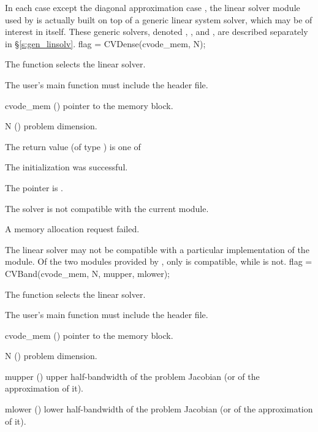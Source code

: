 In each case except the diagonal approximation case {\cvdiag}, the linear
solver module used by {\cvode} is actually built on top of a generic
linear system solver, which may be of interest in itself.  These
generic solvers, denoted {\dense}, {\band}, and {\spgmr}, are described
separately in \S\ref{s:gen_linsolv}.
{
  flag = CVDense(cvode\_mem, N);
}
{
  The function  selects the {\cvdense} linear solver. 

  The user's main function must include the  header file.
}
{
  \begin{args}
  \item[cvode\_mem] ()
    pointer to the {\cvode} memory block.
  \item[N] ()
    problem dimension.
  \end{args}
}
{
  The return value  (of type ) is one of
  \begin{args}
  \item[\Id{SUCCESS}] 
    The {\cvdense} initialization was successful.
  \item[\Id{LIN\_NO\_MEM}]
    The  pointer is .
  \item[\Id{LIN\_ILL\_INPUT}]
    The {\cvdense} solver is not compatible with the current {\nvector} module.
  \item[\Id{LMEM\_FAIL}]
    A memory allocation request failed.
  \end{args}
}
{
  The {\cvdense} linear solver may not be compatible with a particular
  implementation of the {\nvector} module. 
  Of the two {\nvector} modules provided by {\sundials}, only {\nvecs} is 
  compatible, while {\nvecp} is not.
}
{
  flag = CVBand(cvode\_mem, N, mupper, mlower);
}
{
  The function  selects the {\cvband} linear solver. 

  The user's main function must include the  header file.
}
{
  \begin{args}
  \item[cvode\_mem] ()
    pointer to the {\cvode} memory block.
  \item[N] ()
    problem dimension.
  \item[mupper] ()
    upper half-bandwidth of the problem Jacobian (or of the approximation of it).
  \item[mlower] ()
    lower half-bandwidth of the problem Jacobian (or of the approximation of it).
  \end{args}
}
